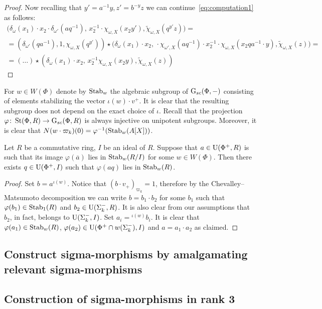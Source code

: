 \begin{proof}
Now recalling that $y' = a ^{-1} y, z' = b^{-y} z$ we can continue~\eqref{eq:computation1} as follows:
\begin{multline*}
 \bigl(\delta_\omega(x_1) \cdot x_2 \cdot \delta_{\omega'}(aq^{-1}),\, x_2^{-1}\cdot \chi_{\omega, X}(x_2 y'), \widetilde{\chi}_{\omega, X}(q^{y'} z) \bigr) = \\ = (\delta_{\omega'}(qa^{-1}), 1, \chi_{\omega, X}(q^{y'})) \star \bigl(\delta_\omega(x_1) \cdot x_2,\, \cdot \chi_{\omega', X}(aq^{-1}) \cdot x_2^{-1}\cdot \chi_{\omega, X}(x_2 q a^{-1} \cdot y ), \widetilde{\chi}_{\omega, X}(z) \bigr) = \\ = (\ldots) \star (\delta_\omega(x_1) \cdot x_2,\, x_2^{-1} \chi_{\omega, X}(x_2y), \widetilde{\chi}_{\omega, X}(z)) \end{multline*} \end{proof}


 For $w\in W(\Phi)$ denote by $\operatorname{Stab}_{w}$ the algebraic subgroup of $\operatorname{G}_{sc}(\Phi, -)$ consisting of elements stabilizing the vector $\iota(w) \cdot v^+$. It is clear that the resulting subgroup does not depend on the exact choice of $\iota$. Recall that the projection $\varphi \colon \operatorname{St}(\Phi, R) \to \operatorname{G}_{sc}(\Phi, R)$ is always injective on unipotent subgroups. Moreover, it is clear that $N(w \cdot \varpi_k)(0) = \varphi^{-1}(\operatorname{Stab}_w(A[X]))$.

\begin{lemma} \label{lem:q}
Let $R$ be a commutative ring, $I$ be an ideal of $R$.
Suppose that $a \in \operatorname{U}(\Phi^+, R)$ is such that its image $\varphi(\overline{a})$ lies in $\operatorname{Stab}_{w}(R/I)$ for some $w \in W(\Phi)$.
Then there exists $q \in \operatorname{U}(\Phi^+, I)$ such that $\varphi(aq)$ lies in $\operatorname{Stab}_{w}(R)$.
\end{lemma}
\begin{proof}
Set $b = a^{\iota(w)}$.
Notice that $(b \cdot v_+)_{\varpi_k} = 1$, therefore by the Chevalley--Matsumoto decomposition we can write $b = b_1 \cdot b_2$ for some $b_1$ such that $\varphi(b_1) \in \operatorname{Stab}_1(R)$ and $b_2 \in \operatorname{U}(\Sigma_k^-, R)$.
It is also clear from our assumptions that $b_2$, in fact, belongs to $\operatorname{U}(\Sigma_k^-, I)$.
Set $a_i = {}^{\iota(w)}b_i$.
It is clear that $\varphi(a_1) \in \operatorname{Stab}_w(R)$, $\varphi(a_2) \in \operatorname{U}(\Phi^+ \cap w(\Sigma_k^-), I)$ and $a = a_1 \cdot a_2$ as claimed.
\end{proof}
\subsection{Construct sigma-morphisms by amalgamating relevant sigma-morphisms}

\subsection{Construction of sigma-morphisms in rank 3}
